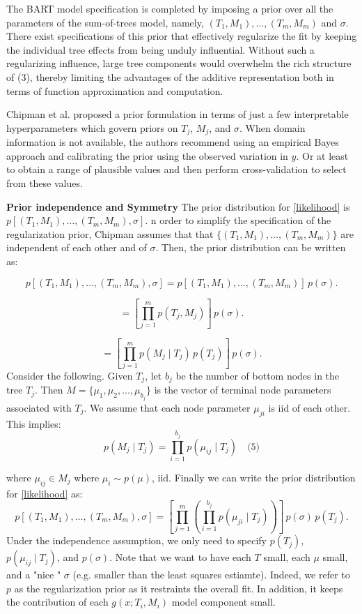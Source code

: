 \documentclass[a4paper,11pt]{article}
\begin{document}
The BART model specification is completed by imposing a prior over all the parameters of the sum-of-trees model, namely, \( (T_1, M_1), \ldots, (T_m, M_m) \) and \( \sigma \). There exist specifications of this prior that effectively regularize the fit by keeping the individual tree effects from being unduly influential. Without such a regularizing influence, large tree components would overwhelm the rich structure of (3), thereby limiting the advantages of the additive representation both in terms of function approximation and computation.

Chipman et al. proposed a prior formulation in terms of just a few interpretable hyperparameters which govern priors on \( T_j \), \( M_j \), and \( \sigma \). When domain information is not available, the authors recommend using an empirical Bayes approach and calibrating the prior using the observed variation in \( y \). Or at least to obtain a range of plausible values and then perform cross-validation to select from these values.

\textbf{Prior independence and Symmetry}
The prior distribution for \eqref{likelihood} is \( p[(T_1, M_1), \ldots, (T_m, M_m), \sigma] \). n order to simplify the specification of the regularization prior, Chipman assumes that  that \( \{(T_1, M_1), \ldots, (T_m, M_m)\} \) are independent of each other and of  \( \sigma \). Then, the prior distribution can be written as:

\[
p[(T_1, M_1), \ldots, (T_m, M_m), \sigma] = p[(T_1, M_1), \ldots, (T_m, M_m)] \, p(\sigma).
\]

\[
= \left[ \prod_{j=1}^m p(T_j, M_j) \right] \, p(\sigma).
\]

\[
= \left[ \prod_{j=1}^m p(M_j \mid T_j) \, p(T_j) \right] \, p(\sigma).
\]
Consider the following. Given $T_j$, let  \( b_j \)  be the number of bottom nodes in the tree \( T_j \). Then \( M = \{\mu_1, \mu_2, \ldots, \mu_{b_j}\} \) is the vector of terminal node parameters associated with \( T_j \).  We assume that each node parameter \( \mu_{ji} \) is iid of each other. This implies: 
\[
p(M_j \mid T_j) = \prod_{i=1}^{b_j} p(\mu_{ij} \mid T_j) \quad \text{(5)}
\]

where \( \mu_{ij} \in M_j \) where \( \mu_i \sim p(\mu) \), iid.
Finally we can write the prior distribution for \eqref{likelihood} as:
\[
p[(T_1, M_1), \ldots, (T_m, M_m), \sigma]= \left[ \prod_{j=1}^m \left( \prod_{i=1}^{b_j} p(\mu_{ji} \mid T_j) \right) \right] \, p(\sigma) \, p(T_j).
\]
Under the independence assumption, we only need to specify \( p(T_j) \), \( p(\mu_{ij} \mid T_j) \), and \( p(\sigma) \). Note that we want to have each $T$ small, each $\mu$ small,  and a "nice " $\sigma$  (e.g. smaller than the least squares estiamte). Indeed, we refer to $p$ as the regularization prior as it restraints the overall fit. In addition, it keeps the contribution of each $g(x;T_i,M_i)$ model component small.  
\end{document}
